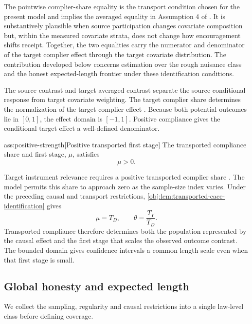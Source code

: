 \documentclass[11pt]{article}
\begin{document}
The pointwise complier-share equality is the transport condition chosen for the present model and implies the averaged equality in Assumption 4 of \citet{ChenHuang2025Generalizing}. It is substantively plausible when source participation changes covariate composition but, within the measured covariate strata, does not change how encouragement shifts receipt. Together, the two equalities carry the numerator and denominator of the target complier effect through the target covariate distribution. The contribution developed below concerns estimation over the rough nuisance class and the honest expected-length frontier under these identification conditions.



The source contrast  and target-averaged contrast  separate the source conditional response from target covariate weighting. The target complier share  determines the normalization of the target complier effect . Because both potential outcomes lie in \([0,1]\), the effect domain  is \([-1,1]\). Positive compliance gives the conditional target effect a well-defined denominator.

\begin{assumptionv}{ass:positive-strength}[Positive transported first stage]
The transported compliance share and first stage, \(\mu\), satisfies
\[
\mu>0.
\]
\end{assumptionv}

Target instrument relevance requires a positive transported complier share \citep{ChenHuang2025Generalizing}. The model permits this share to approach zero as the sample-size index varies. Under the preceding causal and transport restrictions, \cref{obj:lem:transported-cace-identification} gives
\[
\mu=T_D,
\qquad
\theta=\frac{T_Y}{T_D}.
\]
Transported compliance therefore determines both the population represented by the causal effect and the first stage that scales the observed outcome contrast. The bounded domain gives confidence intervals a common length scale even when that first stage is small.

\subsection{Global honesty and expected length}

We collect the sampling, regularity and causal restrictions into a single law-level class before defining coverage.
\end{document}
